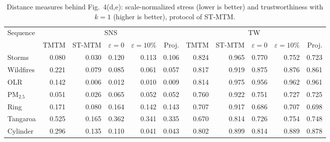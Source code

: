 \begin{table}[H]
\centering\small\setlength{\tabcolsep}{3.2pt}
\caption{Distance measures behind Fig.~4(d,e): scale-normalized stress (lower is better) and trustworthiness with $k=1$ (higher is better), protocol of ST-MTM.}\label{tab:supp_values_geometry}
\begin{tabular}{lrrrrrrrrrr}\toprule
Sequence & \multicolumn{5}{c}{SNS} & \multicolumn{5}{c}{TW}\\\cmidrule(lr){2-6}\cmidrule(lr){7-11}
 & TMTM & ST-MTM & $\varepsilon{=}0$ & $\varepsilon{=}10\%$ & Proj. & TMTM & ST-MTM & $\varepsilon{=}0$ & $\varepsilon{=}10\%$ & Proj.\\\midrule
Storms & 0.080 & 0.030 & 0.120 & 0.113 & 0.106 & 0.824 & 0.965 & 0.770 & 0.752 & 0.723\\
Wildfires & 0.221 & 0.079 & 0.085 & 0.061 & 0.057 & 0.817 & 0.919 & 0.875 & 0.876 & 0.861\\
OLR & 0.142 & 0.006 & 0.012 & 0.010 & 0.009 & 0.814 & 0.975 & 0.956 & 0.962 & 0.961\\
PM$_{2.5}$ & 0.051 & 0.026 & 0.065 & 0.052 & 0.052 & 0.760 & 0.922 & 0.751 & 0.727 & 0.725\\
Ring & 0.171 & 0.080 & 0.164 & 0.142 & 0.143 & 0.707 & 0.917 & 0.686 & 0.707 & 0.698\\
Tangaroa & 0.525 & 0.165 & 0.362 & 0.341 & 0.335 & 0.670 & 0.814 & 0.726 & 0.754 & 0.748\\
Cylinder & 0.296 & 0.135 & 0.110 & 0.041 & 0.043 & 0.802 & 0.899 & 0.814 & 0.889 & 0.878\\
\bottomrule\end{tabular}
\end{table}
